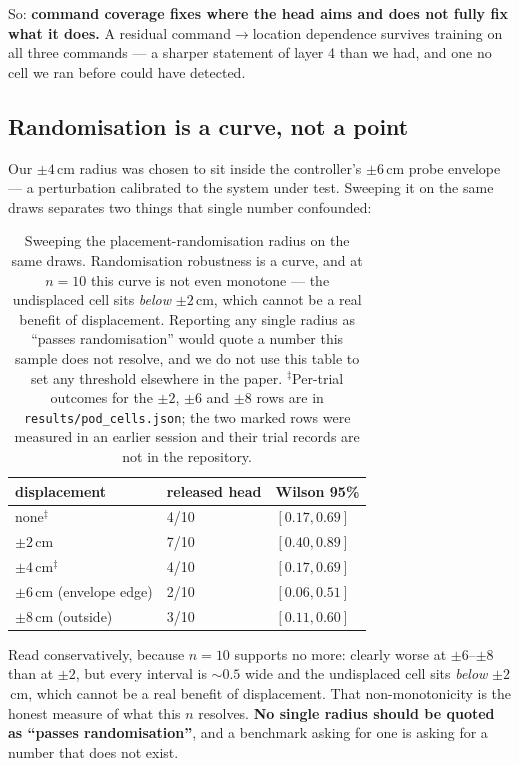 \documentclass[10pt,twocolumn]{article}
\begin{document}
So: \textbf{command coverage fixes where the head aims and does not fully fix
what it does.} A residual command$\to$location dependence survives training on
all three commands --- a sharper statement of layer 4 than we had, and one no
cell we ran before could have detected.

\subsection{Randomisation is a curve, not a point}
\label{sec:sweep}

Our $\pm4$\,cm radius was chosen to sit inside the controller's $\pm6$\,cm probe
envelope --- a perturbation calibrated to the system under test. Sweeping it on
the same draws separates two things that single number confounded:

\begin{table}[h]\centering\small
\begin{tabular}{lll}
\toprule
displacement & released head & Wilson 95\% \\
\midrule
none$^\ddagger$ & 4/10 & $[0.17,0.69]$ \\
$\pm2$\,cm & 7/10 & $[0.40,0.89]$ \\
$\pm4$\,cm$^\ddagger$ & 4/10 & $[0.17,0.69]$ \\
$\pm6$\,cm (envelope edge) & 2/10 & $[0.06,0.51]$ \\
$\pm8$\,cm (outside) & 3/10 & $[0.11,0.60]$ \\
\bottomrule
\end{tabular}
\caption{Sweeping the placement-randomisation radius on the same draws.
Randomisation robustness is a curve, and at $n{=}10$ this curve is not even
monotone --- the undisplaced cell sits \emph{below} $\pm2$\,cm, which cannot be
a real benefit of displacement. Reporting any single radius as ``passes
randomisation'' would quote a number this sample does not resolve, and we do
not use this table to set any threshold elsewhere in the paper.
$^\ddagger$Per-trial outcomes for the $\pm2$, $\pm6$ and $\pm8$ rows are in
\texttt{results/pod\_cells.json}; the two marked rows were measured in an
earlier session and their trial records are not in the repository.}
\label{tab:sweep}
\end{table}

\noindent Read conservatively, because $n{=}10$ supports no more: clearly worse
at $\pm6$--$\pm8$ than at $\pm2$, but every interval is ${\sim}0.5$ wide and the
undisplaced cell sits \emph{below} $\pm2$\,cm, which cannot be a real benefit of
displacement. That non-monotonicity is the honest measure of what this $n$
resolves. \textbf{No single radius should be quoted as ``passes
randomisation''}, and a benchmark asking for one is asking for a number that
does not exist.
\end{document}
